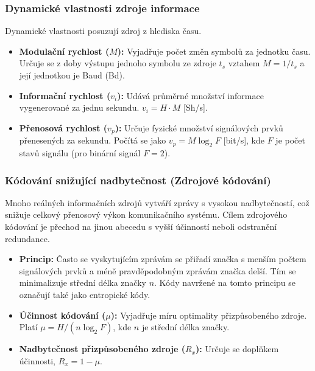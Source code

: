     \subsubsection{Dynamické vlastnosti zdroje informace}
        Dynamické vlastnosti posuzují zdroj z hlediska času.
        \begin{itemize}
            \item \textbf{Modulační rychlost ($M$):} Vyjadřuje počet změn symbolů za jednotku času. Určuje se z doby výstupu jednoho symbolu ze zdroje $t_s$ vztahem $M = 1/t_s$ a její jednotkou je Baud (Bd).
            \item \textbf{Informační rychlost ($v_i$):} Udává průměrné množství informace vygenerované za jednu sekundu. $v_i = H \cdot M$ [Sh/s].
            \item \textbf{Přenosová rychlost ($v_p$):} Určuje fyzické množství signálových prvků přenesených za sekundu. Počítá se jako $v_p = M \log_2 F$ [bit/s], kde $F$ je počet stavů signálu (pro binární signál $F = 2$).
        \end{itemize}
    \subsubsection{Kódování snižující nadbytečnost (Zdrojové kódování)}
        Mnoho reálných informačních zdrojů vytváří zprávy s vysokou nadbytečností, což snižuje celkový přenosový výkon komunikačního systému. Cílem zdrojového kódování je přechod na jinou abecedu s vyšší účinností neboli odstranění redundance.
        \begin{itemize}
            \item \textbf{Princip:} Často se vyskytujícím zprávám se přiřadí značka s menším počtem signálových prvků a méně pravděpodobným zprávám značka delší. Tím se minimalizuje střední délka značky $n$. Kódy navržené na tomto principu se označují také jako entropické kódy.
            \item \textbf{Účinnost kódování ($\mu$):} Vyjadřuje míru optimality přizpůsobeného zdroje. Platí $\mu = H / (n \log_2 F)$, kde $n$ je střední délka značky.
            \item \textbf{Nadbytečnost přizpůsobeného zdroje ($R_x$):} Určuje se doplňkem účinnosti, $R_x = 1 - \mu$.
        \end{itemize}
